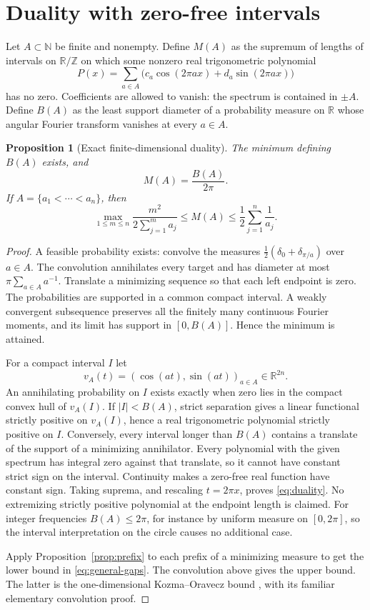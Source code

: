 \documentclass[11pt]{article}
\newtheorem{proposition}[theorem]{Proposition}
\theoremstyle{remark}\newtheorem{remark}[theorem]{Remark}
\newcommand{\R}{\mathbb R}
\newcommand{\N}{\mathbb N}
\newcommand{\Z}{\mathbb Z}
\begin{document}
\section{Duality with zero-free intervals}

Let $A\subset\N$ be finite and nonempty. Define $M(A)$ as the supremum of lengths
of intervals on $\R/\Z$ on which some nonzero real trigonometric polynomial
\[
 P(x)=\sum_{a\in A}\bigl(c_a\cos(2\pi ax)+d_a\sin(2\pi ax)\bigr)
\]
has no zero. Coefficients are allowed to vanish: the spectrum is contained in
$\pm A$. Define $B(A)$ as the least support diameter of a probability measure
on $\R$ whose angular Fourier transform vanishes at every $a\in A$.

\begin{proposition}[Exact finite-dimensional duality]\label{prop:duality}
The minimum defining $B(A)$ exists, and
\begin{equation}\label{eq:duality}
 M(A)=\frac{B(A)}{2\pi}.
\end{equation}
If $A=\{a_1<\cdots<a_n\}$, then
\begin{equation}\label{eq:general-gaps}
 \max_{1\le m\le n}\frac{m^2}{2\sum_{j=1}^m a_j}
 \le M(A)\le\frac12\sum_{j=1}^n\frac1{a_j}.
\end{equation}
\end{proposition}

\begin{proof}
A feasible probability exists: convolve the measures
$\tfrac12(\delta_0+\delta_{\pi/a})$ over $a\in A$. The convolution annihilates
every target and has diameter at most $\pi\sum_{a\in A}a^{-1}$.
Translate a minimizing sequence so that each left endpoint is zero. The
probabilities are supported in a common compact interval. A weakly convergent
subsequence preserves all the finitely many continuous Fourier moments, and its
limit has support in $[0,B(A)]$. Hence the minimum is attained.

For a compact interval $I$ let
\[
 v_A(t)=(\cos(at),\sin(at))_{a\in A}\in\R^{2n}.
\]
An annihilating probability on $I$ exists exactly when zero lies in the compact
convex hull of $v_A(I)$. If $|I|<B(A)$, strict separation gives a linear
functional strictly positive on $v_A(I)$, hence a real trigonometric polynomial
strictly positive on $I$. Conversely, every interval longer than $B(A)$ contains
a translate of the support of a minimizing annihilator. Every polynomial with
the given spectrum has integral zero against that translate, so it cannot have
constant strict sign on the interval. Continuity makes a zero-free real function
have constant sign. Taking suprema, and rescaling $t=2\pi x$, proves
\eqref{eq:duality}. No extremizing strictly positive polynomial at the endpoint
length is claimed. For integer frequencies $B(A)\le2\pi$, for instance by
uniform measure on $[0,2\pi]$, so the interval interpretation on the circle
causes no additional case.

Apply Proposition~\ref{prop:prefix} to each prefix of a minimizing measure to
get the lower bound in \eqref{eq:general-gaps}. The convolution above gives
the upper bound. The latter is the one-dimensional Kozma--Oravecz bound
\cite{KO}, with its familiar elementary convolution proof.
\end{proof}
\end{document}
